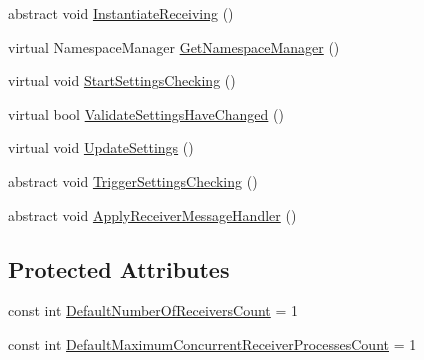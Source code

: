 \begin{DoxyCompactItemize}
abstract void \hyperlink{classCqrs_1_1Azure_1_1ServiceBus_1_1AzureBus_ac9f66dd531dcde49be72ba8f2cb28e9b_ac9f66dd531dcde49be72ba8f2cb28e9b}{Instantiate\+Receiving} ()
\item 
virtual Namespace\+Manager \hyperlink{classCqrs_1_1Azure_1_1ServiceBus_1_1AzureBus_ae7e6f920864cceec2850be9baac84803_ae7e6f920864cceec2850be9baac84803}{Get\+Namespace\+Manager} ()
\item 
virtual void \hyperlink{classCqrs_1_1Azure_1_1ServiceBus_1_1AzureBus_acb7f47329c17646805545e78d0776efe_acb7f47329c17646805545e78d0776efe}{Start\+Settings\+Checking} ()
\item 
virtual bool \hyperlink{classCqrs_1_1Azure_1_1ServiceBus_1_1AzureBus_a9fa1f5a74819100c40d8079ac6a6adb9_a9fa1f5a74819100c40d8079ac6a6adb9}{Validate\+Settings\+Have\+Changed} ()
\item 
virtual void \hyperlink{classCqrs_1_1Azure_1_1ServiceBus_1_1AzureBus_aa41ae78c1e674cfd9316c573ca5d1bab_aa41ae78c1e674cfd9316c573ca5d1bab}{Update\+Settings} ()
\item 
abstract void \hyperlink{classCqrs_1_1Azure_1_1ServiceBus_1_1AzureBus_ae501f84c4983bfa3b2ae4551749ac998_ae501f84c4983bfa3b2ae4551749ac998}{Trigger\+Settings\+Checking} ()
\item 
abstract void \hyperlink{classCqrs_1_1Azure_1_1ServiceBus_1_1AzureBus_aad25a164e9e526c59d8ef98635c98095_aad25a164e9e526c59d8ef98635c98095}{Apply\+Receiver\+Message\+Handler} ()
\end{DoxyCompactItemize}
\subsection*{Protected Attributes}
\begin{DoxyCompactItemize}
\item 
const int \hyperlink{classCqrs_1_1Azure_1_1ServiceBus_1_1AzureBus_a19642a14d6cf036cbbdb68b9ba7e635d_a19642a14d6cf036cbbdb68b9ba7e635d}{Default\+Number\+Of\+Receivers\+Count} = 1
\item 
const int \hyperlink{classCqrs_1_1Azure_1_1ServiceBus_1_1AzureBus_a12c3d07b7ad1836e85a449e6adc8b5df_a12c3d07b7ad1836e85a449e6adc8b5df}{Default\+Maximum\+Concurrent\+Receiver\+Processes\+Count} = 1
\end{DoxyCompactItemize}
